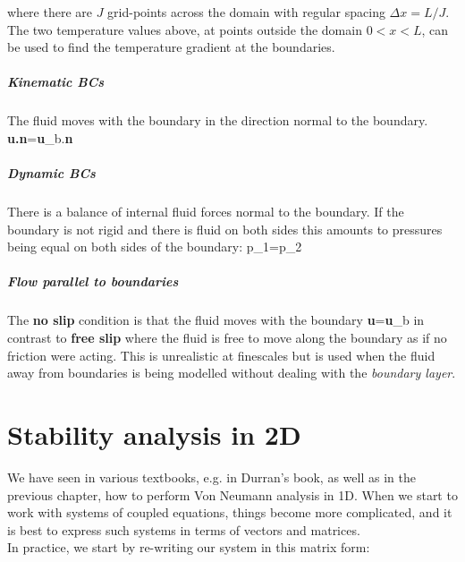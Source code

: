 where there are $J$ grid-points across the domain with regular spacing
$\Delta x=L/J$. The two temperature values above, at points outside the
domain $0<x<L$, can be used to find the temperature gradient at the
boundaries.

\paragraph{Kinematic BCs}

The fluid moves with the boundary in the direction normal to the boundary.
\BEQ
{\bf u.n}={\bf u}_b.{\bf n}
\EEQ

\paragraph{Dynamic BCs}

There is a balance of internal fluid forces normal to the boundary. If
the boundary is not rigid and there is fluid on both sides this
amounts to pressures being equal on both sides of the boundary: 
\BEQ
p_1=p_2 
\EEQ

\paragraph{Flow parallel to boundaries}

The {\bf no slip} condition is that the fluid moves with the boundary
\BEQ
{\bf u}={\bf u}_b
\EEQ
in contrast to {\bf free slip} where the fluid is free to move along
the boundary as if no friction were acting. This is unrealistic at
finescales but is used when the fluid away from boundaries
is being modelled without dealing with the {\em boundary layer}. 

\vspace{1em} 

\newpage
\chapter{Stability analysis in 2D}

We have seen in various textbooks, e.g. in Durran's book, as well as in the previous chapter, how to perform Von Neumann analysis in 1D. When we start to work with systems of coupled equations, things become more complicated, and it is best to express such systems in terms of vectors and matrices. \\

In practice, we start by re-writing our system in this matrix form:


